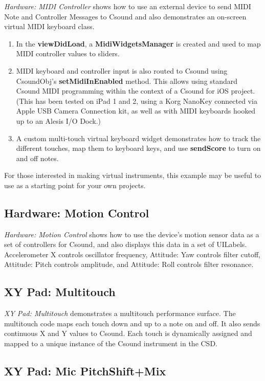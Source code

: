 \documentclass[11pt]{article}
\begin{document}
\emph{Hardware: MIDI Controller} shows how to use an external device to send MIDI Note and Controller Messages to Csound and also demonstrates an on-screen virtual MIDI keyboard class.

\begin{enumerate}
\item In the \textbf{viewDidLoad}, a \textbf{MidiWidgetsManager} is created and used to map MIDI controller values to sliders.
\item MIDI keyboard and controller input is also routed to Csound using CsoundObj's \textbf{setMidiInEnabled} method. This allows using standard Csound MIDI programming within the context of a Csound for iOS project. (This has been tested on iPad 1 and 2, using a Korg NanoKey connected via Apple USB Camera Connection kit, as well as with MIDI keyboards hooked up to an Alesis I/O Dock.)
\item A custom multi-touch virtual keyboard widget demonstrates how to track the different touches, map them to keyboard keys, and use \textbf{sendScore} to turn on and off notes.
\end{enumerate}

For those interested in making virtual instruments, this example may be useful to use as a starting point for your own projects.

\subsection{Hardware: Motion Control}

\emph{Hardware: Motion Control} shows how to use the device's motion sensor data as a set of controllers for Csound, and also displays this data in a set of UILabels. Accelerometer X controls oscillator frequency, Attitude: Yaw controls filter cutoff, Attitude: Pitch controls amplitude, and Attitude: Roll controls filter resonance.

\subsection{XY Pad: Multitouch}

\emph{XY Pad: Multitouch} demonstrates a multitouch performance surface. The multitouch code maps each touch down and up to a note on and off.  It also sends continuous X and Y values to Csound.  Each touch is dynamically assigned and mapped to a unique instance of the Csound instrument in the CSD.


\subsection{XY Pad: Mic PitchShift+Mix}
\end{document}
